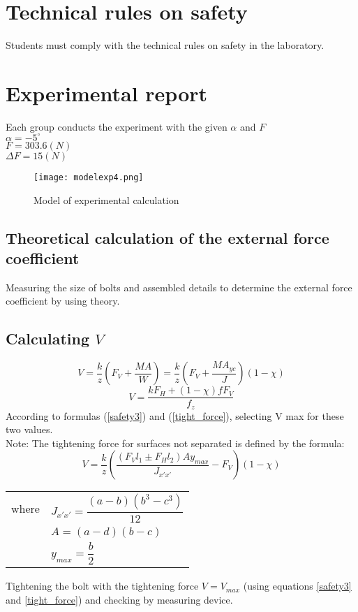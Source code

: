 \section{Technical rules on safety}
Students must comply with the technical rules on safety in the laboratory.

\section{Experimental report}
Each group conducts the experiment with the given $ \alpha $ and $ F $\\
$ \alpha = -5^\circ $\\
$ F = 303.6\unit{(N)} $\\
$ \Delta F = 15\unit{(N)} $
\begin{figure}
	\centering
	\texttt{[image: modelexp4.png]}
	\caption{Model of experimental calculation}
	\label{exp4fig}
\end{figure}
\subsection{Theoretical calculation of the external force coefficient}
Measuring the size of bolts and assembled details to determine the external force
coefficient by using theory.
\subsection{Calculating $ V $}
\begin{equation}
	V = \dfrac{k}{z}\left(F_V+\dfrac{MA}{W}\right) = \dfrac{k}{z}\left(F_V+\dfrac{MA_{yc}}{J}\right)(1-\chi)
	\label{safety3}
\end{equation}
\begin{equation}
	V = \dfrac{kF_H+(1-\chi)fF_V}{f_z}
	\label{tight_force}
\end{equation}
According to formulas (\ref{safety3}) and (\ref{tight_force}), selecting V max for these two values.\\
Note: The tightening force for surfaces not separated is defined by the formula:
\[V = \dfrac{k}{z}\left(\dfrac{(F_Vl_1\pm F_Hl_2)Ay_{max}}{J_{x'x'}}-F_V\right)(1-\chi)\]
\begin{tabular}{ll}
	where & $ J_{x'x'} = \dfrac{(a-b)(b^3-c^3)}{12} $\\
	& $ A = (a-d)(b-c) $\\
	& $ y_{max} = \dfrac{b}{2} $\\
\end{tabular}\vskip2mm
Tightening the bolt with the tightening force $ V = V_{max} $ (using equations \ref{safety3} and \ref{tight_force}) and
checking by measuring device.
